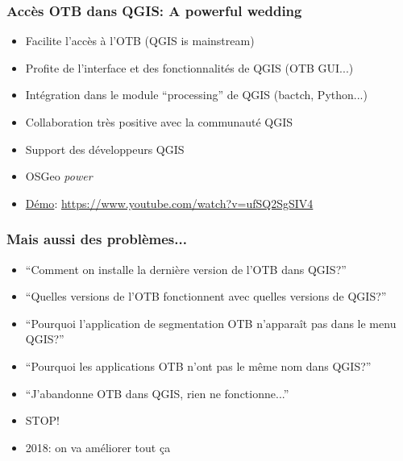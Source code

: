 \documentclass[8pt]{beamer}
\begin{document}
\begin{frame}
\frametitle{Accès OTB dans QGIS: A powerful wedding}
\begin{itemize}
\item Facilite l'accès à l'OTB (QGIS is mainstream)
\item Profite de l'interface et des fonctionnalités de QGIS (OTB GUI...)
\item Intégration dans le module ``processing'' de QGIS (bactch, Python...)
\item Collaboration très positive avec la communauté QGIS
\item Support des développeurs QGIS
\item OSGeo \textit{power}
\item \href{https://www.youtube.com/watch?v=ufSQ2SgSIV4}{Démo}: \url{https://www.youtube.com/watch?v=ufSQ2SgSIV4}
\end{itemize}
\end{frame}

\begin{frame}
\frametitle{Mais aussi des problèmes...}
\begin{itemize}
\item ``Comment on installe la dernière version de l'OTB dans QGIS?''
\item ``Quelles versions de l'OTB fonctionnent avec quelles versions de QGIS?''
\item ``Pourquoi l'application de segmentation OTB n'apparaît pas dans le menu QGIS?''
\item ``Pourquoi les applications OTB n'ont pas le même nom dans QGIS?''
\item ``J'abandonne OTB dans QGIS, rien ne fonctionne...''
\item \alert{STOP!}
\item 2018: on va améliorer tout ça
\end{itemize}

\end{frame}
\end{document}
